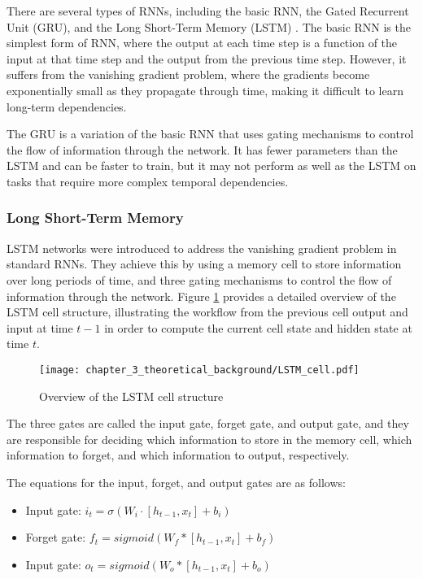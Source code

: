 There are several types of RNNs, including the basic RNN, the Gated Recurrent Unit (GRU), and the Long Short-Term Memory (LSTM) \cite{hochreiter1997long}. The basic RNN is the simplest form of RNN, where the output at each time step is a function of the input at that time step and the output from the previous time step. However, it suffers from the vanishing gradient problem, where the gradients become exponentially small as they propagate through time, making it difficult to learn long-term dependencies.

The GRU is a variation of the basic RNN that uses gating mechanisms to control the flow of information through the network. It has fewer parameters than the LSTM and can be faster to train, but it may not perform as well as the LSTM on tasks that require more complex temporal dependencies.

\subsubsection{Long Short-Term Memory}
\label{subsubsec:3_LSTMs}

LSTM networks were introduced to address the vanishing gradient problem in standard RNNs. They achieve this by using a memory cell to store information over long periods of time, and three gating mechanisms to control the flow of information through the network. Figure \ref{fig:chapter_3_theoretical_background/LSTM} provides a detailed overview of the LSTM cell structure, illustrating the workflow from the previous cell output and input at time $t-1$ in order to compute the current cell state and hidden state at time $t$.

\begin{figure}[h]
	\centering
	\texttt{[image: chapter\_3\_theoretical\_background/LSTM\_cell.pdf]}
	\caption{Overview of the LSTM cell structure}
	\label{fig:chapter_3_theoretical_background/LSTM}
\end{figure}

The three gates are called the input gate, forget gate, and output gate, and they are responsible for deciding which information to store in the memory cell, which information to forget, and which information to output, respectively.

The equations for the input, forget, and output gates are as follows:

\begin{itemize}
	\item Input gate: $i_t = \sigma(W_i \cdot [h_{t-1}, x_t] + b_i)$
	\item Forget gate: $f_t = sigmoid(W_f * [h_{t-1}, x_t] + b_f)$
	\item Input gate: $o_t = sigmoid(W_o * [h_{t-1}, x_t] + b_o)$
\end{itemize}


